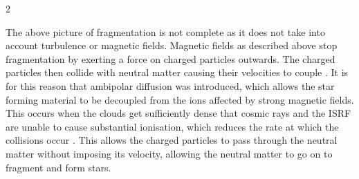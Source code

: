 \documentclass[a4paper,11pt]{article}
\begin{document}
\begin{multicols}{2}
\smallskip
\par\noindent The above picture of fragmentation is not complete as it does not take into account turbulence or magnetic fields. Magnetic fields as described above stop fragmentation by exerting a force on charged particles outwards. The charged particles then collide with neutral matter causing their velocities to couple \parencite{B_fields}. It is for this reason that ambipolar diffusion was introduced, which allows the star forming material to be decoupled from the ions affected by strong magnetic fields. This occurs when the clouds get sufficiently dense that cosmic rays and the ISRF are unable to cause substantial ionisation, which reduces the rate at which the collisions occur \parencite{ambipolar_diffusion}. This allows the charged particles to pass through the neutral matter without imposing its velocity, allowing the neutral matter to go on to fragment and form stars. 
\smallskip

\end{multicols}
\end{document}
